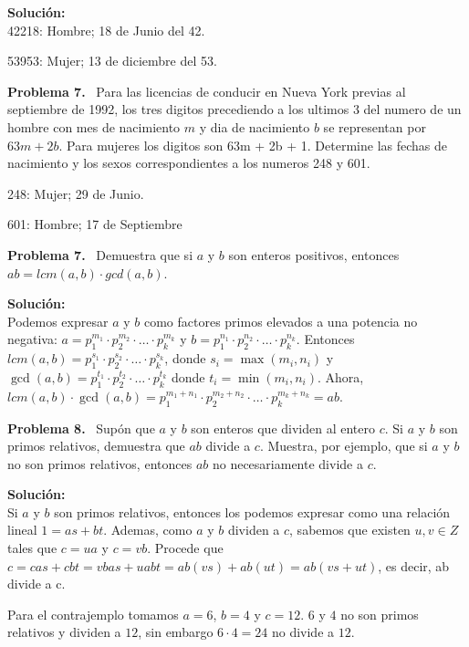 \documentclass{article}
\newcounter{problem}
\newcounter{solution}
\newcommand\Problem[1]{%
  \stepcounter{problem}%
  \textbf{Problema #1.}~%
  \setcounter{solution}{0}%
}
\newcommand\TheSolution{%
  \textbf{Solución:}\\%
}
\begin{document}
\TheSolution{}
42218: Hombre; 18 de Junio del 42.

53953: Mujer; 13 de diciembre del 53.

\Problem{7} Para las licencias de conducir en Nueva York previas al septiembre
de 1992, los tres digitos precediendo a los ultimos 3 del numero de un hombre
con mes de nacimiento $m$ y dia de nacimiento $b$ se representan por $63m + 2b$.
Para mujeres los digitos son 63m + 2b + 1. Determine las fechas de nacimiento y
los sexos correspondientes a los numeros 248 y 601.

248: Mujer; 29 de Junio.

601: Hombre; 17 de Septiembre

\Problem{7} Demuestra que si $a$ y $b$ son enteros positivos, entonces $ab =
lcm(a, b)\cdot gcd(a, b)$.

\TheSolution{} Podemos expresar $a$ y $b$ como factores primos elevados a una
potencia no negativa: $a = p_1^{m_1}\cdot p_2^{m_2}\cdot \ldots\cdot p_k^{m_k}$
y $b = p_1^{n_1}\cdot p_2^{n_2}\cdot \ldots\cdot p_k^{n_k}$. Entonces $lcm(a, b) =
p_1^{s_1}\cdot p_2^{s_2}\cdot \ldots\cdot p_k^{s_k}$, donde $s_i = \max(m_i,
n_i)$ y $\gcd(a, b) = p_1^{t_1}\cdot p_2^{t_2}\cdot \ldots\cdot p_k^{t_k}$ donde
$t_i = \min(m_i, n_i)$. Ahora, $lcm(a, b) \cdot \gcd(a, b) = p_1^{m_1 +
n_1}\cdot p_2^{m_2 + n_2}\cdot \ldots\cdot p_k^{m_k + n_k} = ab$.

\Problem{8} Supón que $a$ y $b$ son enteros que dividen al entero $c$. Si $a$ y
$b$ son primos relativos, demuestra que $ab$ divide a $c$. Muestra, por ejemplo,
que si $a$ y $b$ no son primos relativos, entonces $ab$ no necesariamente divide
a $c$.

\TheSolution{} Si $a$ y $b$ son primos relativos, entonces los podemos expresar
como una relación lineal $1 = as + bt$. Ademas, como $a$ y $b$ dividen a $c$,
sabemos que existen $u, v \in Z$ tales que $c = ua$ y $c = vb$. Procede que $c =
cas + cbt = vbas + uabt = ab(vs) + ab(ut) = ab(vs + ut)$, es decir, ab divide a
c.

Para el contrajemplo tomamos $a = 6$, $b = 4$ y $c = 12$. $6$ y $4$ no son
primos relativos y dividen a $12$, sin embargo $6 \cdot 4 = 24$ no divide a
$12$.
\end{document}
